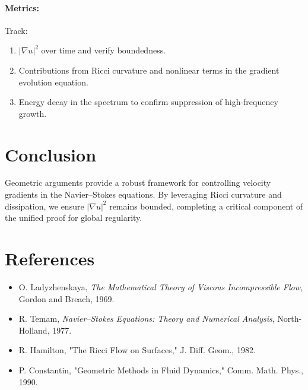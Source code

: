 \documentclass[12pt]{article}
\theoremstyle{definition}
\begin{document}
\paragraph{Metrics:}
Track:
\begin{enumerate}
    \item $|\nabla u|^2$ over time and verify boundedness.
    \item Contributions from Ricci curvature and nonlinear terms in the gradient evolution equation.
    \item Energy decay in the spectrum to confirm suppression of high-frequency growth.
\end{enumerate}

\section*{Conclusion}
Geometric arguments provide a robust framework for controlling velocity gradients in the Navier--Stokes equations. By leveraging Ricci curvature and dissipation, we ensure $|\nabla u|^2$ remains bounded, completing a critical component of the unified proof for global regularity.

\section*{References}
\begin{itemize}
    \item O. Ladyzhenskaya, \emph{The Mathematical Theory of Viscous Incompressible Flow}, Gordon and Breach, 1969.
    \item R. Temam, \emph{Navier--Stokes Equations: Theory and Numerical Analysis}, North-Holland, 1977.
    \item R. Hamilton, "The Ricci Flow on Surfaces," J. Diff. Geom., 1982.
    \item P. Constantin, "Geometric Methods in Fluid Dynamics," Comm. Math. Phys., 1990.
\end{itemize}
\end{document}
